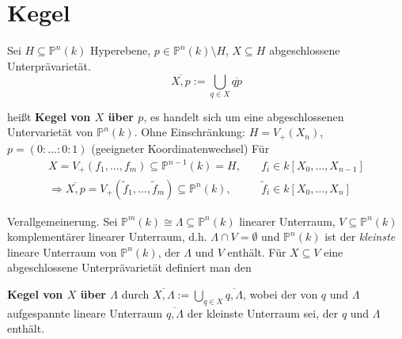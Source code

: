 \section{Kegel}
\label{sec:Kegel}

Sei $H\subseteq\mathbb{P}^{n}(k)$ Hyperebene, $p\in\mathbb{P}^{n}(k)\setminus H$,
$X\subseteq H$ abgeschlossene Unterprävarietät.
\[
  \overline{X,p}:=\bigcup_{q\in X}\overline{qp}
\]

heißt \textbf{Kegel von $X$ über $p$}, es handelt sich um eine
abgeschlossenen Untervarietät von $\mathbb{P}^{n}(k)$. Ohne Einschränkung: $H=V_{+}(X_{n})$,
$p=(0:\ldots:0:1)$ (geeigneter Koordinatenwechsel)
Für  
\begin{align*}
  X=V_{+}(f_{1},\ldots,f_{m})\subseteq\mathbb{P}^{n-1}(k)=H, & \quad f_{i}\in k[X_{0},\ldots,X_{n-1}]\\
  \Rightarrow \overline{X,p}=V_{+}(\tilde{f}_{1},\ldots,\tilde{f}_{m})\subseteq\mathbb{P}^{n}(k), & \quad\tilde{f}_{i}\in k[X_{0},\ldots,X_{n}]
\end{align*}

Verallgemeinerung. Sei $\mathbb{P}^{m}(k)\cong\Lambda\subseteq\mathbb{P}^{n}(k)$
linearer Unterraum, $V\subseteq\mathbb{P}^{n}(k)$ komplementärer
linearer Unterraum, d.h. $\Lambda\cap V=\emptyset$ und $\mathbb{P}^{n}(k)$
ist der \emph{kleinste} lineare Unterraum von $\mathbb{P}^{n}(k)$, der $\Lambda$
und $V$ enthält. Für $X\subseteq V$ eine abgeschlossene Unterprävarietät definiert man den

\textbf{Kegel von $X$ über $\Lambda$} durch $\overline{X,\Lambda} :=\bigcup_{q\in X}\overline{q,\Lambda}$,
wobei der von $q$ und $\Lambda$ aufgespannte lineare Unterraum $\overline{q,\Lambda}$
der kleinste Unterraum sei, der $q$ und $\Lambda$ enthält.

